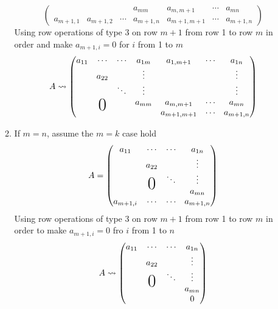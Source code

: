 \begin{enumerate}
\begin{enumerate}
\begin{equation}
\begin{pmatrix}
& & & a_{mm}& a_{m,m+1} & \cdots & a_{mn}\\
a_{m+1,1} & a_{m+1,2} & \cdots & a_{m+1,n} & a_{m+1,m+1} & \cdots & a_{m+1,n}
\end{pmatrix}
\end{equation}
Using row operations of type 3 on row $m+1$ from row 1 to row $m$ in
order and make $a_{m+1,i} = 0 $ for $i$ from 1 to $m$
\begin{equation}
A \leadsto 
\begin{pmatrix}
a_{11} & \cdots & \cdots & a_{1m} & a_{1,m+1} & \cdots & a_{1n}\\
& a_{22} & & \vdots &  & & \vdots\\
& & \ddots & \vdots&  & & \vdots\\
& \bigzero& & a_{mm}& a_{m,m+1} & \cdots & a_{mn}\\
& &&& a_{m+1,m+1} & \cdots & a_{m+1,n}
\end{pmatrix}
\end{equation}
\item If $m=n$, assume the $m=k$ case hold
\begin{equation}
A = \begin{pmatrix}
a_{11} & \cdots & \cdots & a_{1n}\\
      & a_{22}& & \vdots\\
& \bigzero & \ddots& \vdots\\
& & & a_{mn}\\
a_{m+1,i} &\cdots & \cdots & a_{m+1,n}
\end{pmatrix}
\end{equation}
Using row operations of type 3 on row $m+1$ from row 1 to row $m$ in
order to make $a_{m+1,i} =0 $ fro $i$ from 1 to $n$
\begin{equation}
A \leadsto \begin{pmatrix}
a_{11} & \cdots & \cdots & a_{1n}\\
      & a_{22}& & \vdots\\
& \bigzero & \ddots& \vdots\\
& & & a_{mn}\\
& & & 0
\end{pmatrix}
\end{equation}
\end{enumerate}
\end{enumerate}

